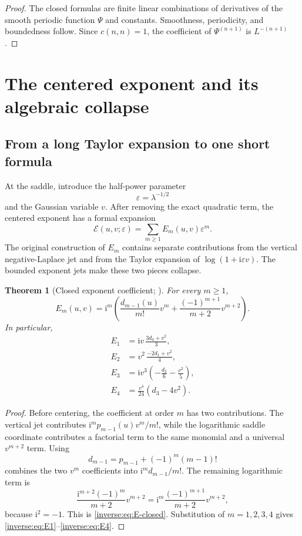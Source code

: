 \documentclass[11pt,oneside]{article}
\newtheorem{theorem}{Theorem}[section]
\theoremstyle{definition}
\theoremstyle{remark}
\newcommand{\ii}{\mathrm i}
\begin{document}
\begin{proof}
The closed formulas are finite linear combinations of derivatives of the
smooth periodic function $\Psi$ and constants.  Smoothness, periodicity,
and boundedness follow.  Since $c(n,n)=1$, the coefficient of
$\Psi^{(n+1)}$ is $L^{-(n+1)}$.
\end{proof}


\section{The centered exponent and its algebraic collapse}
\label{inverse:sec:centered-exponent}

\subsection{From a long Taylor expansion to one short formula}

At the saddle, introduce the half-power parameter
\[
 \varepsilon=\lambda^{-1/2}
\]
and the Gaussian variable $v$.  After removing the exact quadratic term,
the centered exponent has a formal expansion
\[
 \mathcal E(u,v;\varepsilon)
 =\sum_{m\geq1}E_m(u,v)\varepsilon^m.
\]
The original construction of $E_m$ contains separate contributions from
the vertical negative-Laplace jet and from the Taylor expansion of
$\log(1+\ii\varepsilon v)$.  The bounded exponent jets make these two
pieces collapse.

\begin{theorem}[Closed exponent coefficient; \Formalized]
\label{inverse:thm:closed-exponent}
For every $m\geq1$,
\begin{equation}
 E_m(u,v)=\ii^m\left(
   \frac{d_{m-1}(u)}{m!}v^m
   +\frac{(-1)^{m+1}}{m+2}v^{m+2}
 \right). \label{inverse:eq:E-closed}
\end{equation}
In particular,
\begin{align}
 E_1&=\ii v\,\frac{3d_0+v^2}{3}, \label{inverse:eq:E1}\\
 E_2&=v^2\,\frac{-2d_1+v^2}{4}, \label{inverse:eq:E2}\\
 E_3&=\ii v^3\left(-\frac{d_2}{6}-\frac{v^2}{5}\right), \label{inverse:eq:E3}\\
 E_4&=\frac{v^4}{24}(d_3-4v^2). \label{inverse:eq:E4}
\end{align}
\end{theorem}

\begin{proof}
Before centering, the coefficient at order $m$ has two contributions.
The vertical jet contributes $\ii^m p_{m-1}(u)v^m/m!$, while the
logarithmic saddle coordinate contributes a factorial term to the same
monomial and a universal $v^{m+2}$ term.  Using
\[
 d_{m-1}=p_{m-1}+(-1)^m(m-1)!
\]
combines the two $v^m$ coefficients into
$\ii^m d_{m-1}/m!$.  The remaining logarithmic term is
\[
 \frac{\ii^{m+2}(-1)^m}{m+2}v^{m+2}
 =\ii^m\frac{(-1)^{m+1}}{m+2}v^{m+2},
\]
because $\ii^2=-1$.  This is \eqref{inverse:eq:E-closed}.  Substitution of
$m=1,2,3,4$ gives \eqref{inverse:eq:E1}--\eqref{inverse:eq:E4}.
\end{proof}
\end{document}
